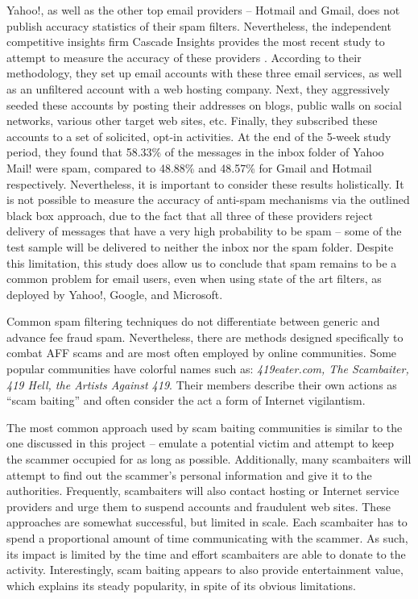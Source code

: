 Yahoo!, as well as the other top email providers -- Hotmail and Gmail, does not publish accuracy statistics of their spam filters. Nevertheless, the independent competitive insights firm Cascade Insights provides the most recent study to attempt to measure the accuracy of these providers \cite{P8}. According to their methodology, they set up email accounts with these three email services, as well as an unfiltered account with a web hosting company. Next, they aggressively seeded these accounts by posting their addresses on blogs, public walls on social networks, various other target web sites, etc. Finally, they subscribed these accounts to a set of solicited, opt-in activities. At the end of the 5-week study period, they found that 58.33\% of the messages in the inbox folder of Yahoo Mail! were spam, compared to 48.88\% and 48.57\% for Gmail and Hotmail respectively. Nevertheless, it is important to consider these results holistically. It is not possible to measure the accuracy of anti-spam mechanisms via the outlined black box approach, due to the fact that all three of these providers reject delivery of messages that have a very high probability to be spam -- some of the test sample will be delivered to neither the inbox nor the spam folder. Despite this limitation, this study does allow us to conclude that spam remains to be a common problem for email users, even when using state of the art filters, as deployed by Yahoo!, Google, and Microsoft.

Common spam filtering techniques do not differentiate between generic and advance fee fraud spam. Nevertheless, there are methods designed specifically to combat AFF scams and are most often employed by online communities. Some popular communities have colorful names such as: \textit{419eater.com, The Scambaiter, 419 Hell, the Artists Against 419}. Their members describe their own actions as ``scam baiting'' and often consider the act a form of Internet vigilantism. 

The most common approach used by scam baiting communities is similar to the one discussed in this project -- emulate a potential victim and attempt to keep the scammer occupied for as long as possible. Additionally, many scambaiters will attempt to find out the scammer's personal information and give it to the authorities. Frequently, scambaiters will also contact hosting or Internet service providers and urge them to suspend accounts and fraudulent web sites. These approaches are somewhat successful, but limited in scale. Each scambaiter has to spend a proportional amount of time communicating with the scammer. As such, its impact is limited by the time and effort scambaiters are able to donate to the activity. Interestingly, scam baiting appears to also provide entertainment value, which explains its steady popularity, in spite of its obvious limitations.

